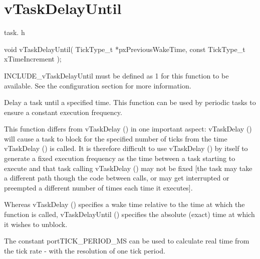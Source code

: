 \hypertarget{group__v_task_delay_until}{}\section{v\+Task\+Delay\+Until}
\label{group__v_task_delay_until}
task. h 
\begin{DoxyPre}void vTaskDelayUntil( TickType\_t *pxPreviousWakeTime, const TickType\_t xTimeIncrement );\end{DoxyPre}


I\+N\+C\+L\+U\+D\+E\+\_\+v\+Task\+Delay\+Until must be defined as 1 for this function to be available. See the configuration section for more information.

Delay a task until a specified time. This function can be used by periodic tasks to ensure a constant execution frequency.

This function differs from v\+Task\+Delay () in one important aspect\+: v\+Task\+Delay () will cause a task to block for the specified number of ticks from the time v\+Task\+Delay () is called. It is therefore difficult to use v\+Task\+Delay () by itself to generate a fixed execution frequency as the time between a task starting to execute and that task calling v\+Task\+Delay () may not be fixed \mbox{[}the task may take a different path though the code between calls, or may get interrupted or preempted a different number of times each time it executes\mbox{]}.

Whereas v\+Task\+Delay () specifies a wake time relative to the time at which the function is called, v\+Task\+Delay\+Until () specifies the absolute (exact) time at which it wishes to unblock.

The constant port\+T\+I\+C\+K\+\_\+\+P\+E\+R\+I\+O\+D\+\_\+\+MS can be used to calculate real time from the tick rate -\/ with the resolution of one tick period.


